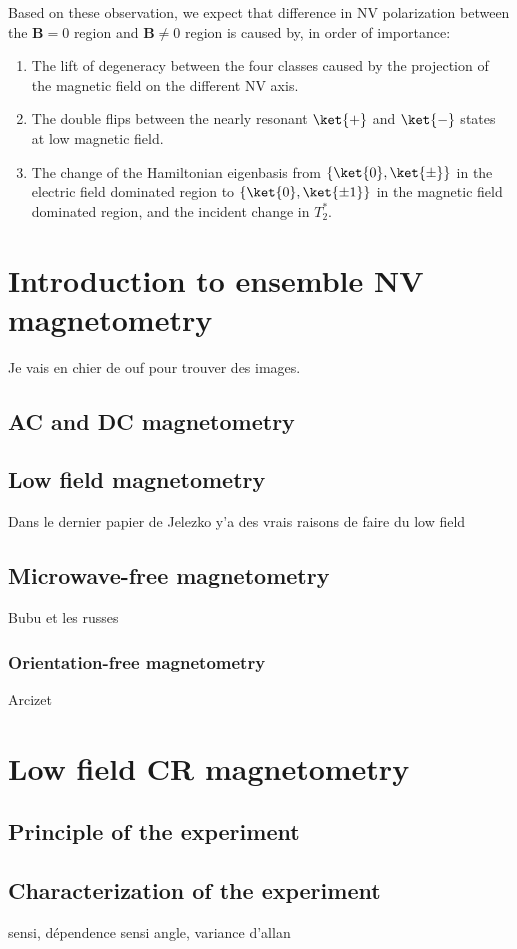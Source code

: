 \documentclass[a4paper,11pt]{report}
\begin{document}
Based on these observation, we expect that difference in NV polarization between the $\mathbf{B}=0$ region and $\mathbf{B} \neq 0$ region is caused by, in order of importance:
\begin{enumerate}
\item The lift of degeneracy between the four classes caused by the projection of the magnetic field on the different NV axis.
\item The double flips between the nearly resonant $\ket{+}$ and $\ket{-}$ states at low magnetic field.
\item The change of the Hamiltonian eigenbasis from $\{\ket{0}, \ket{\pm} \}$ in the electric field dominated region to $\{\ket{0}, \ket{\pm 1} \}$ in the magnetic field dominated region, and the incident change in $T_2^*$.
\end{enumerate}

\section{Introduction to ensemble NV magnetometry}
Je vais en chier de ouf pour trouver des images.
\subsection{AC and DC magnetometry}
\subsection{Low field magnetometry}
Dans le dernier papier de Jelezko y'a des vrais raisons de faire du low field
\subsection{Microwave-free magnetometry}
Bubu et les russes
\subsubsection{Orientation-free magnetometry}
Arcizet


\section{Low field CR magnetometry}

\subsection{Principle of the experiment}

\subsection{Characterization of the experiment}
sensi, dépendence sensi angle, variance d'allan
\end{document}
